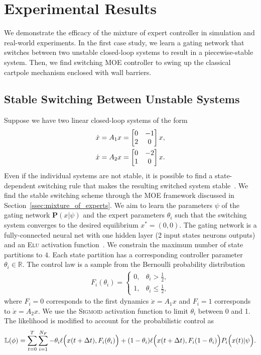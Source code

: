 \section{Experimental Results}
\label{sec:moe_results}
We demonstrate the efficacy of the mixture of expert controller in simulation
and real-world experiments.
%
In the first case study, we learn a gating network that switches between two
unstable closed-loop systems to result in a piecewise-stable system.
%
Then, we find switching MOE controller to swing up the classical cartpole
mechanism enclosed with wall barriers.
%

\subsection{Stable Switching Between Unstable Systems}

Suppose we have two linear closed-loop systems of the form 
\begin{equation}
    \begin{gathered}
        \dot{x} = A_1x = \begin{bmatrix}0 & -1 \\ 2 & 0\end{bmatrix}x, \\
        \dot{x} = A_2x = \begin{bmatrix}0 & -2 \\ 1 & 0\end{bmatrix}x.
    \end{gathered}
    \label{eq:unstable_closedloop}
\end{equation}
%
Even if the individual systems are not stable, it is possible to find a
state-dependent switching rule that makes the resulting switched system
stable~\cite{liberzon2003switching}. 
%
We find the stable switching scheme through the MOE framework discussed in
Section~\ref{ssec:mixture_of_experts}.
%
We aim to learn the parameters $\psi$ of the gating network $\mathbf{P}(x|
\psi)$ and the expert parameters $\theta_i$ such that the switching system
converges to the desired equilibrium $x^* = (0, 0)$.
%
The gating network is a fully-connected neural net with one hidden layer (2 input states 
 neurons  outputs) and an \textsc{Elu} activation
function~\cite{clevert2015fast}.
%
We constrain the maximum number of state partitions to $4$.
%
Each state partition has a corresponding controller parameter $\theta_i \in
\mathbb{R}$. 
%
The control law is a sample from the Bernoulli probability distribution
\begin{align}
    F_i(\theta_i) = \begin{cases}
       0, & \theta_i > \frac{1}{2}, \\
       1, & \theta_i \leq \frac{1}{2},
    \end{cases}
    \label{eq:bernoulli}
\end{align}
\noindent where $F_i = 0$ corresponds to the first dynamics $\dot{x} = A_1
x$ and $F_i=1$ corresponds to $\dot{x} = A_2x$.
%
We use the \textsc{Sigmoid} activation function to limit $\theta_i$ between 0
and 1.
%
The likelihood is modified to account for the probabilistic control as
\begin{align*}
    \mathbb{L}(\phi) = \sum_{t=0}^{T}  \sum_{i=1}^{N_F} -\theta_i \ell \Bigl(x(t + \Delta t), F_i(\theta_i) \Bigr) + (1- \theta_i)\ell \Bigl(x(t + \Delta t), F_i(1-\theta_i) \Bigr) P_i\Bigl(x(t)| \psi \Bigr)  .
\end{align*}

